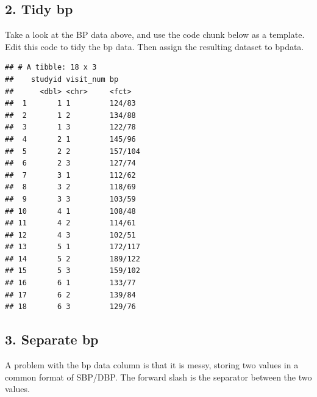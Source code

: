 \documentclass[
]{book}
\newenvironment{Shaded}{\begin{snugshade}}{\end{snugshade}}
\newcommand{\DataTypeTok}[1]{\textcolor[rgb]{0.13,0.29,0.53}{#1}}
\newcommand{\KeywordTok}[1]{\textcolor[rgb]{0.13,0.29,0.53}{\textbf{#1}}}
\newcommand{\NormalTok}[1]{#1}
\newcommand{\OperatorTok}[1]{\textcolor[rgb]{0.81,0.36,0.00}{\textbf{#1}}}
\newcommand{\StringTok}[1]{\textcolor[rgb]{0.31,0.60,0.02}{#1}}
\begin{document}
\hypertarget{tidy-bp}{%
\subsection{2. Tidy bp}\label{tidy-bp}}

Take a look at the BP data above, and use the code chunk below as a template. Edit this code to tidy the bp data.
Then assign the resulting dataset to bpdata.

\begin{Shaded}
\end{Shaded}

\begin{verbatim}
## # A tibble: 18 x 3
##    studyid visit_num bp     
##      <dbl> <chr>     <fct>  
##  1       1 1         124/83 
##  2       1 2         134/88 
##  3       1 3         122/78 
##  4       2 1         145/96 
##  5       2 2         157/104
##  6       2 3         127/74 
##  7       3 1         112/62 
##  8       3 2         118/69 
##  9       3 3         103/59 
## 10       4 1         108/48 
## 11       4 2         114/61 
## 12       4 3         102/51 
## 13       5 1         172/117
## 14       5 2         189/122
## 15       5 3         159/102
## 16       6 1         133/77 
## 17       6 2         139/84 
## 18       6 3         129/76
\end{verbatim}

\hypertarget{separate-bp}{%
\subsection{3. Separate bp}\label{separate-bp}}

A problem with the bp data column is that it is messy, storing two values in a common format of SBP/DBP. The forward slash is the separator between the two values.
\end{document}
